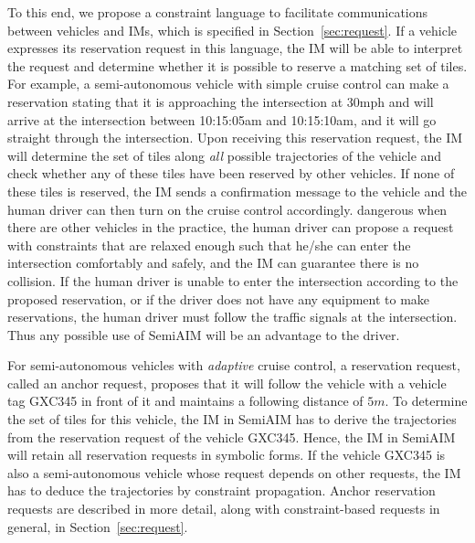 To this end, we propose a constraint language to facilitate
communications between vehicles and IMs, which is specified in
Section~\ref{sec:request}.  If a vehicle expresses its reservation
request in this language, the IM will be able to interpret the request
and determine whether it is possible to reserve a matching set of
tiles.  For example, a semi-autonomous vehicle with simple cruise
control can make a reservation stating that it is approaching the
intersection at 30mph and will arrive at the intersection between
10:15:05am and 10:15:10am, and it will go straight through the
intersection.  Upon receiving this reservation request, the IM will
determine the set of tiles along \emph{all} possible trajectories of
the vehicle and check whether any of these tiles have been reserved by
other vehicles.  If none of these tiles is reserved, the IM sends a
confirmation message to the vehicle and the human driver can then turn
on the cruise control accordingly.  %
dangerous when there are other vehicles in the %
practice, the human driver can propose a request with constraints that
are relaxed enough such that he/she can enter the intersection
comfortably and safely, and the IM can guarantee there is no
collision. If the human driver is unable to enter the intersection
according to the proposed reservation, or if the driver does not have
any equipment to make reservations, the human driver must follow the
traffic signals at the intersection.  Thus any possible use of SemiAIM
will be an advantage to the driver.


For semi-autonomous vehicles with \emph{adaptive} cruise control, a
reservation request, called an anchor request, proposes that it will
follow the vehicle with a vehicle tag GXC345 in front of it and
maintains a following distance of $5m$.  To determine the set of tiles
for this vehicle, the IM in SemiAIM has to derive the trajectories
from the reservation request of the vehicle GXC345.  Hence, the IM in
SemiAIM will retain all reservation requests in symbolic forms.  If
the vehicle GXC345 is also a semi-autonomous vehicle whose request
depends on other requests, the IM has to deduce the trajectories by
constraint propagation.  Anchor reservation requests are described in
more detail, along with constraint-based requests in general, in
Section~\ref{sec:request}.


